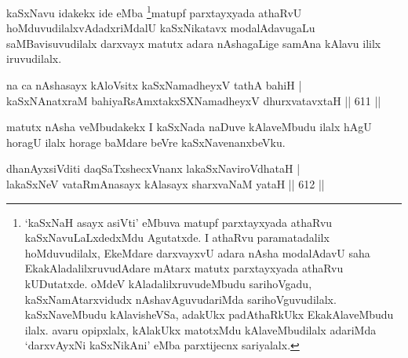 \begin{artha}
kaSxNavu idakekx ide eMba \footnote[1]{`kaSxNaH asayx asiVti' eMbuva matupf parxtayxyada athaRvu kaSxNavuLaLxdedxMdu Agutatxde. I athaRvu paramatadalilx hoMduvudilalx, EkeMdare darxvayxvU adara nAsha modalAdavU saha EkakAladalilxruvudAdare mAtarx matutx parxtayxyada athaRvu kUDutatxde. oMdeV kAladalilxruvudeMbudu sarihoVgadu, kaSxNamAtarxvidudx nAshavAguvudariMda sarihoVguvudilalx. kaSxNaveMbudu kAlavisheVSa, adakUkx padAthaRkUkx EkakAlaveMbudu ilalx. avaru opipxlalx, kAlakUkx matotxMdu kAlaveMbudilalx adariMda `darxvAyxNi kaSxNikAni' eMba parxtijecnx sariyalalx.}matupf parxtayxyada athaRvU hoMduvudilalxvAdadxriMdalU kaSxNikatavx modalAdavugaLu saMBavisuvudilalx darxvayx matutx adara nAshagaLige samAna kAlavu ililx iruvudilalx.
\end{artha}

\begin{shl}
\footnotemark[2]na ca nAshasayx kAloV\s sitx kaSxNamadheyxV tathA bahiH | \\
kaSxNAnatxraM bahiyaRsAmxtakxSXNamadheyxV dhurxvatavxtaH \hfill||  611 ||  
\end{shl}

\begin{artha}
matutx nAsha veMbudakekx I kaSxNada naDuve kAlaveMbudu ilalx hAgU horagU ilalx horage baMdare beVre kaSxNavenanxbeVku.
\end{artha}


\begin{shl}
dhanAyxsiVditi daqSaTxshecxVnanx lakaSxNaviroVdhataH | \\
\footnotemark[3]lakaSxNeV vataRmAnasayx kAlasayx sharxvaNaM yataH \hfill||  612 ||  
\end{shl}

